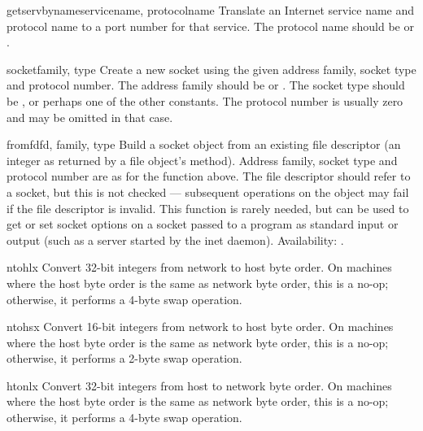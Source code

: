 \begin{funcdesc}{getservbyname}{servicename, protocolname}
Translate an Internet service name and protocol name to a port number
for that service.  The protocol name should be  or
.
\end{funcdesc}

\begin{funcdesc}{socket}{family, type}
Create a new socket using the given address family, socket type and
protocol number.  The address family should be  or
.  The socket type should be ,
 or perhaps one of the other  constants.
The protocol number is usually zero and may be omitted in that case.
\end{funcdesc}

\begin{funcdesc}{fromfd}{fd, family, type}
Build a socket object from an existing file descriptor (an integer as
returned by a file object's  method).  Address family,
socket type and protocol number are as for the  function
above.  The file descriptor should refer to a socket, but this is not
checked --- subsequent operations on the object may fail if the file
descriptor is invalid.  This function is rarely needed, but can be
used to get or set socket options on a socket passed to a program as
standard input or output (such as a server started by the \UNIX{} inet
daemon).
Availability: \UNIX.
\end{funcdesc}

\begin{funcdesc}{ntohl}{x}
Convert 32-bit integers from network to host byte order.  On machines
where the host byte order is the same as network byte order, this is a
no-op; otherwise, it performs a 4-byte swap operation.
\end{funcdesc}

\begin{funcdesc}{ntohs}{x}
Convert 16-bit integers from network to host byte order.  On machines
where the host byte order is the same as network byte order, this is a
no-op; otherwise, it performs a 2-byte swap operation.
\end{funcdesc}

\begin{funcdesc}{htonl}{x}
Convert 32-bit integers from host to network byte order.  On machines
where the host byte order is the same as network byte order, this is a
no-op; otherwise, it performs a 4-byte swap operation.
\end{funcdesc}

